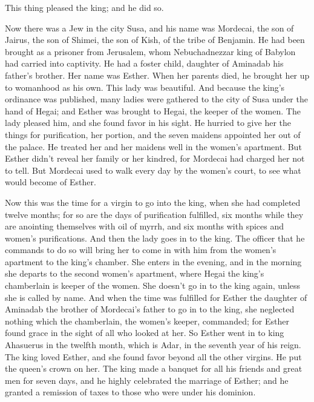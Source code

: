 This thing pleased the king; and he did so.

 Now there was a Jew in the city Susa, and his name was
Mordecai, the son of Jairus, the son of Shimei, the son of Kish, of the
tribe of Benjamin.  He had been brought as a prisoner from
Jerusalem, whom Nebuchadnezzar king of Babylon had carried into
captivity.  He had a foster child, daughter of Aminadab
his father's brother. Her name was Esther. When her parents died, he
brought her up to womanhood as his own. This lady was beautiful.
 And because the king's ordinance was published, many
ladies were gathered to the city of Susa under the hand of Hegai; and
Esther was brought to Hegai, the keeper of the women.  The
lady pleased him, and she found favor in his sight. He hurried to give
her the things for purification, her portion, and the seven maidens
appointed her out of the palace. He treated her and her maidens well in
the women's apartment.  But Esther didn't reveal her
family or her kindred, for Mordecai had charged her not to tell.
 But Mordecai used to walk every day by the women's
court, to see what would become of Esther.

 Now this was the time for a virgin to go into the king,
when she had completed twelve months; for so are the days of
purification fulfilled, six months while they are anointing themselves
with oil of myrrh, and six months with spices and women's purifications.
 And then the lady goes in to the king. The officer that
he commands to do so will bring her to come in with him from the women's
apartment to the king's chamber.  She enters in the
evening, and in the morning she departs to the second women's apartment,
where Hegai the king's chamberlain is keeper of the women. She doesn't
go in to the king again, unless she is called by name. 
And when the time was fulfilled for Esther the daughter of Aminadab the
brother of Mordecai's father to go in to the king, she neglected nothing
which the chamberlain, the women's keeper, commanded; for Esther found
grace in the sight of all who looked at her.  So Esther
went in to king Ahasuerus in the twelfth month, which is Adar, in the
seventh year of his reign.  The king loved Esther, and
she found favor beyond all the other virgins. He put the queen's crown
on her.  The king made a banquet for all his friends and
great men for seven days, and he highly celebrated the marriage of
Esther; and he granted a remission of taxes to those who were under his
dominion.

